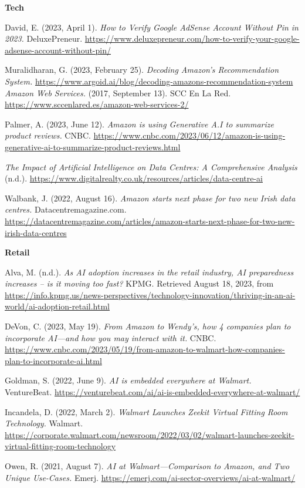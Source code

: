 \documentclass[
]{article}
\begin{document}
\textbf{Tech}

David, E. (2023, April 1). \emph{How to Verify Google AdSense Account Without Pin in 2023.} DeluxePreneur. \url{https://www.deluxepreneur.com/how-to-verify-your-google-adsense-account-without-pin/}

Muralidharan, G. (2023, February 25). \emph{Decoding Amazon's Recommendation System.} \url{https://www.argoid.ai/blog/decoding-amazons-recommendation-system}
\emph{Amazon Web Services.} (2017, September 13). SCC En La Red. \url{https://www.sccenlared.es/amazon-web-services-2/}

Palmer, A. (2023, June 12). \emph{Amazon is using Generative A.I to summarize product reviews.} CNBC. \url{https://www.cnbc.com/2023/06/12/amazon-is-using-generative-ai-to-summarize-product-reviews.html}

\emph{The Impact of Artificial Intelligence on Data Centres: A Comprehensive Analysis} (n.d.). \url{https://www.digitalrealty.co.uk/resources/articles/data-centre-ai}

Walbank, J. (2022, August 16). \emph{Amazon starts next phase for two new Irish data centres.} Datacentremagazine.com. \url{https://datacentremagazine.com/articles/amazon-starts-next-phase-for-two-new-irish-data-centres}

\textbf{Retail}

Alva, M. (n.d.). \emph{As AI adoption increases in the retail industry, AI preparedness increases -- is it moving too fast?} KPMG. Retrieved August 18, 2023, from \url{https://info.kpmg.us/news-perspectives/technology-innovation/thriving-in-an-ai-world/ai-adoption-retail.html}

DeVon, C. (2023, May 19). \emph{From Amazon to Wendy's, how 4 companies plan to incorporate AI---and how you may interact with it.} CNBC. \url{https://www.cnbc.com/2023/05/19/from-amazon-to-walmart-how-companies-plan-to-incorporate-ai.html}

Goldman, S. (2022, June 9). \emph{AI is embedded everywhere at Walmart.} VentureBeat. \url{https://venturebeat.com/ai/ai-is-embedded-everywhere-at-walmart/}

Incandela, D. (2022, March 2). \emph{Walmart Launches Zeekit Virtual Fitting Room Technology.} Walmart. \url{https://corporate.walmart.com/newsroom/2022/03/02/walmart-launches-zeekit-virtual-fitting-room-technology}

Owen, R. (2021, August 7). \emph{AI at Walmart---Comparison to Amazon, and Two Unique Use-Cases.} Emerj. \url{https://emerj.com/ai-sector-overviews/ai-at-walmart/}
\end{document}
